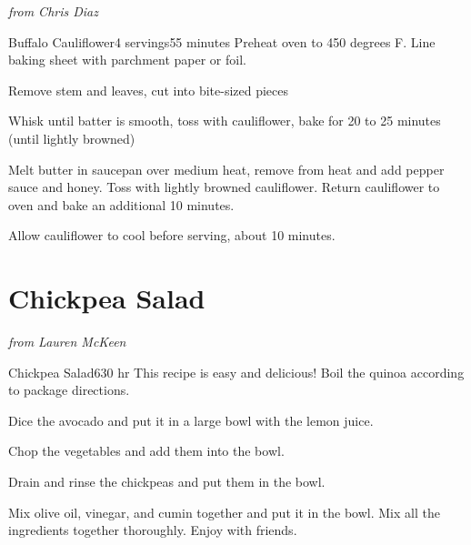 \documentclass[openany]{book}
\begin{document}
\emph{from Chris Diaz}

\begin{recipe}{Buffalo Cauliflower}{4 servings}{55 minutes}
\freeform Preheat oven to 450 degrees F.  Line baking sheet with parchment paper or foil.

Remove stem and leaves, cut into bite-sized pieces


Whisk until batter is smooth, toss with cauliflower, bake for 20 to 25 minutes (until lightly browned)


Melt butter in saucepan over medium heat, remove from heat and add pepper sauce and honey. Toss with lightly browned cauliflower. Return cauliflower to oven and bake an additional 10 minutes.

\freeform Allow cauliflower to cool before serving, about 10 minutes.

\end{recipe}

\chapter{Chickpea Salad}\label{chickpea-salad}

\emph{from Lauren McKeen}

\begin{recipe}{Chickpea Salad}{6}{30 hr}
\freeform This recipe is easy and delicious!
Boil the quinoa according to package directions.

Dice the avocado and put it in a large bowl with the lemon juice.

Chop the vegetables and add them into the bowl.

Drain and rinse the chickpeas and put them in the bowl.

Mix olive oil, vinegar, and cumin together and put it in the bowl. Mix all the ingredients together thoroughly. Enjoy with friends.
\end{recipe}
\end{document}
